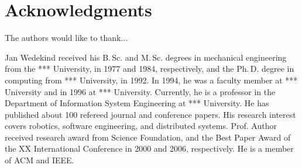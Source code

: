 \documentclass[10pt,journal,compsoc]{joser1}
\begin{document}
%
%
%
\section*{Acknowledgments}
The authors would like to thank...





\begin{IEEEbiography}[{wedekind_20131110_f06}]{Jan Wedekind}
received his B.\,Sc. and
M.\,Sc. degrees in mechanical engineering from the *** University,
in 1977 and 1984, respectively, and the Ph.\,D. degree in
computing from *** University, in 1992. In 1994, he was a
faculty member at *** University and in 1996 at ***
University. Currently, he is a professor in the Department of
Information System Engineering at *** University.
He has published about 100 refereed journal and conference papers.
His research interest covers robotics, software engineering, and distributed
systems.
Prof. Author received research award from Science Foundation, and
the Best Paper Award of the XX International Conference in 2000 and
2006, respectively. He is a member of ACM and IEEE.
\end{IEEEbiography}
\end{document}
